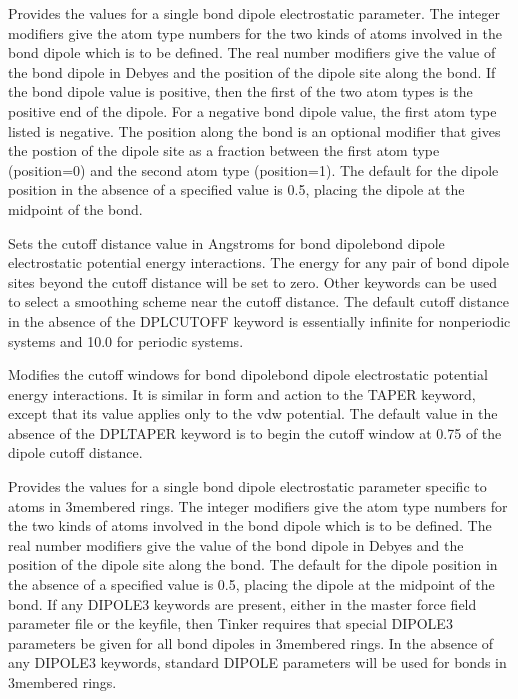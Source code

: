 \documentclass[letterpaper,11pt,english]{sphinxmanual}
\begin{document}

  Provides the values for a single bond dipole electrostatic parameter. The integer modifiers give the atom type numbers for the two kinds of atoms involved in the bond dipole which is to be defined. The real number modifiers give the value of the bond dipole in Debyes and the position of the dipole site along the bond. If the bond dipole value is positive, then the first of the two atom types is the positive end of the dipole. For a negative bond dipole value, the first atom type listed is negative. The position along the bond is an optional modifier that gives the postion of the dipole site as a fraction between the first atom type (position=0) and the second atom type (position=1). The default for the dipole position in the absence of a specified value is 0.5, placing the dipole at the midpoint of the bond.

  Sets the cutoff distance value in Angstroms for bond dipole\sphinxhyphen{}bond dipole electrostatic potential energy interactions. The energy for any pair of bond dipole sites beyond the cutoff distance will be set to zero. Other keywords can be used to select a smoothing scheme near the cutoff distance. The default cutoff distance in the absence of the DPL\sphinxhyphen{}CUTOFF keyword is essentially infinite for nonperiodic systems and 10.0 for periodic systems.

  Modifies the cutoff windows for bond dipole\sphinxhyphen{}bond dipole electrostatic potential energy interactions. It is similar in form and action to the TAPER keyword, except that its value applies only to the vdw potential. The default value in the absence of the DPL\sphinxhyphen{}TAPER keyword is to begin the cutoff window at 0.75 of the dipole cutoff distance.

  Provides the values for a single bond dipole electrostatic parameter specific to atoms in 3\sphinxhyphen{}membered rings. The integer modifiers give the atom type numbers for the two kinds of atoms involved in the bond dipole which is to be defined. The real number modifiers give the value of the bond dipole in Debyes and the position of the dipole site along the bond. The default for the dipole position in the absence of a specified value is 0.5, placing the dipole at the midpoint of the bond. If any DIPOLE3 keywords are present, either in the master force field parameter file or the keyfile, then Tinker requires that special DIPOLE3 parameters be given for all bond dipoles in 3\sphinxhyphen{}membered rings. In the absence of any DIPOLE3 keywords, standard DIPOLE parameters will be used for bonds in 3\sphinxhyphen{}membered rings.
\end{document}
